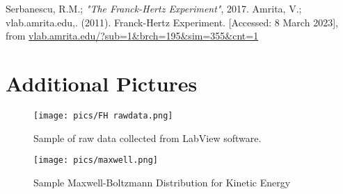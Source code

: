 \documentclass[12pt, letterpaper, twoside]{article}
\begin{document}
\vfill\pagebreak
\appendix

\begin{thebibliography}{10}
     Serbanescu, R.M.; \textit{"The Franck-Hertz Experiment"}, 2017.
     Amrita, V.; vlab.amrita.edu,. (2011). Franck-Hertz Experiment. [Accessed: 8 March 2023], from \url{vlab.amrita.edu/?sub=1&brch=195&sim=355&cnt=1}
\end{thebibliography}

\section*{Additional Pictures}

\begin{figure}[!ht]
    \centering
    \texttt{[image: pics/FH rawdata.png]}
    \caption{Sample of raw data collected from LabView software.}
\end{figure}

\begin{figure}[!ht]
    \centering
    \texttt{[image: pics/maxwell.png]}
    \caption{Sample Maxwell-Boltzmann Distribution for Kinetic Energy}
    \label{fig:maxwell}
\end{figure}
\end{document}
